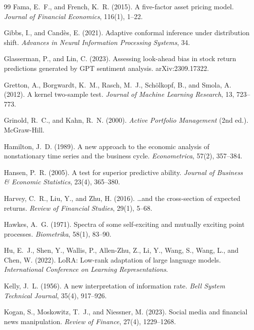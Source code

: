 \documentclass[11pt,a4paper]{article}
\theoremstyle{plain}
\theoremstyle{definition}
\begin{document}
\begin{thebibliography}{99}
Fama, E.~F., and French, K.~R. (2015). A five-factor asset pricing model. \emph{Journal of Financial Economics}, 116(1), 1--22.

Gibbs, I., and Cand\`es, E. (2021). Adaptive conformal inference under distribution shift. \emph{Advances in Neural Information Processing Systems}, 34.

Glasserman, P., and Lin, C. (2023). Assessing look-ahead bias in stock return predictions generated by GPT sentiment analysis. arXiv:2309.17322.

Gretton, A., Borgwardt, K.~M., Rasch, M.~J., Sch\"olkopf, B., and Smola, A. (2012). A kernel two-sample test. \emph{Journal of Machine Learning Research}, 13, 723--773.

Grinold, R.~C., and Kahn, R.~N. (2000). \emph{Active Portfolio Management} (2nd ed.). McGraw-Hill.

Hamilton, J.~D. (1989). A new approach to the economic analysis of nonstationary time series and the business cycle. \emph{Econometrica}, 57(2), 357--384.

Hansen, P.~R. (2005). A test for superior predictive ability. \emph{Journal of Business \& Economic Statistics}, 23(4), 365--380.

Harvey, C.~R., Liu, Y., and Zhu, H. (2016). \ldots and the cross-section of expected returns. \emph{Review of Financial Studies}, 29(1), 5--68.

Hawkes, A.~G. (1971). Spectra of some self-exciting and mutually exciting point processes. \emph{Biometrika}, 58(1), 83--90.

Hu, E.~J., Shen, Y., Wallis, P., Allen-Zhu, Z., Li, Y., Wang, S., Wang, L., and Chen, W. (2022). LoRA: Low-rank adaptation of large language models. \emph{International Conference on Learning Representations}.

Kelly, J.~L. (1956). A new interpretation of information rate. \emph{Bell System Technical Journal}, 35(4), 917--926.

Kogan, S., Moskowitz, T.~J., and Niessner, M. (2023). Social media and financial news manipulation. \emph{Review of Finance}, 27(4), 1229--1268.


\end{thebibliography}
\end{document}
